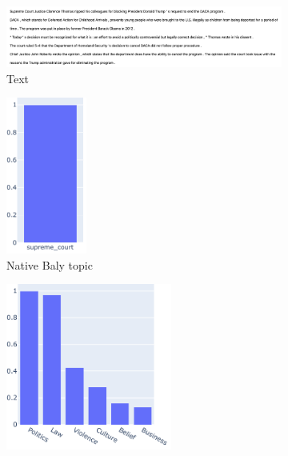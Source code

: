 \begin{figure}
	\centering
	\begin{subfigure}{\textwidth} %
		\includegraphics[width=\textwidth]{figures/article_topic_example.png}
		\caption{Text} %
	\end{subfigure}
	\vspace{1em} %
	\begin{subfigure}{0.45\textwidth} %
		\centering\includegraphics[width=0.29\textwidth]{figures/baly_topics.pdf}
		\caption{Native Baly topic} %
            \label{fig:topic_analysis_different_tools_baly} 
	\end{subfigure}
	\begin{subfigure}{0.45\textwidth} %
		\centering\includegraphics[width=0.6\textwidth]{figures/coarse_topics.pdf}

\end{subfigure}
\end{figure}
